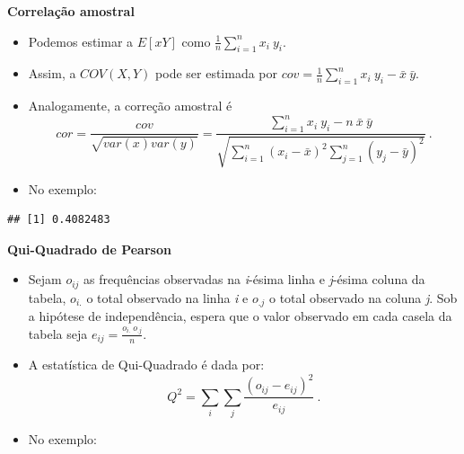 \documentclass[
]{book}
\newenvironment{Shaded}{\begin{snugshade}}{\end{snugshade}}
\newcommand{\FunctionTok}[1]{\textcolor[rgb]{0.13,0.29,0.53}{\textbf{#1}}}
\newcommand{\NormalTok}[1]{#1}
\newcommand{\OtherTok}[1]{\textcolor[rgb]{0.56,0.35,0.01}{#1}}
\newcommand{\SpecialCharTok}[1]{\textcolor[rgb]{0.81,0.36,0.00}{\textbf{#1}}}
\begin{document}
\textbf{Correlação amostral}

\begin{itemize}
\item
  Podemos estimar a \(E[xY]\) como \(\displaystyle \frac{1}{n}\sum_{i=1}^n x_i~y_i\).
\item
  Assim, a \(COV(X,Y)\) pode ser estimada por \(\displaystyle cov = \frac{1}{n}\sum_{i=1}^n x_i~y_i - \bar{x}~\bar{y}\).
\item
  Analogamente, a correção amostral é \[cor = \dfrac{cov}{\sqrt{var(x)var(y)}} = \dfrac{\displaystyle \sum_{i=1}^n x_i~y_i - n~\bar{x}~\bar{y}}{\displaystyle \sqrt{\sum_{i=1}^n (x_i-\bar{x})^2\sum_{j=1}^n(y_j-\bar{y})^2}}~.\]
\item
  No exemplo:
\end{itemize}

\begin{Shaded}
\end{Shaded}

\begin{verbatim}
## [1] 0.4082483
\end{verbatim}

\textbf{Qui-Quadrado de Pearson}

\begin{itemize}
\item
  Sejam \(o_{ij}\) as frequências observadas na \emph{i}-ésima linha e \emph{j}-ésima coluna da tabela, \(o_{i.}\) o total observado na linha \emph{i} e \(o_{.j}\) o total observado na coluna \emph{j}. Sob a hipótese de independência, espera que o valor observado em cada casela da tabela seja \(\displaystyle e_{ij} = \frac{o_{i.}~o_{.j}}{n}\).
\item
  A estatística de Qui-Quadrado é dada por:
  \[Q^2 = \sum_i \sum_j \frac{(o_{ij}-e_{ij})^2}{e_{ij}}~.\]
\item
  No exemplo:
\end{itemize}

\begin{Shaded}
\end{Shaded}
\end{document}
